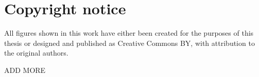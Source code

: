 \chapter{Copyright notice}

All figures shown in this work have either been created for the purposes of this thesis or designed and published as Creative Commons BY, with attribution to the original authors.

ADD MORE
